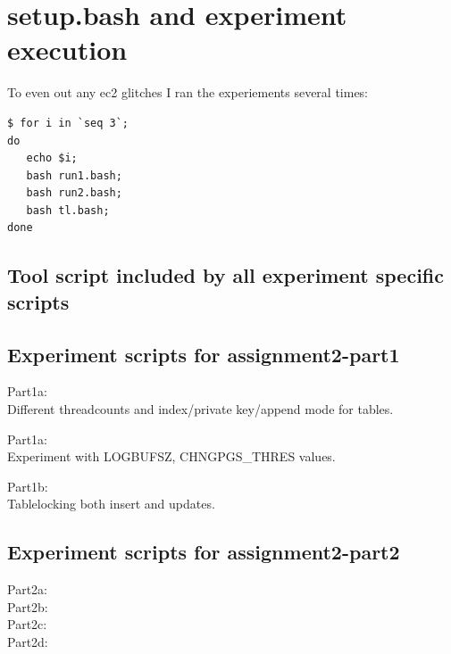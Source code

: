 \section{setup.bash and experiment execution}\label{app:setup}
To even out any ec2 glitches I ran the experiements several times:
\begin{verbatim}
$ for i in `seq 3`; 
do 
   echo $i; 
   bash run1.bash; 
   bash run2.bash; 
   bash tl.bash; 
done
\end{verbatim}

\subsection{Tool script included by all experiment specific scripts}


\subsection{Experiment scripts for assignment2-part1}

Part1a:\\
Different threadcounts and index/private key/append mode for tables.

Part1a:\\
Experiment with LOGBUFSZ, CHNGPGS\_THRES values.

Part1b:\\
Tablelocking both insert and updates.

\subsection{Experiment scripts for assignment2-part2}
Part2a:\\


Part2b:\\


Part2c:\\


Part2d:\\



